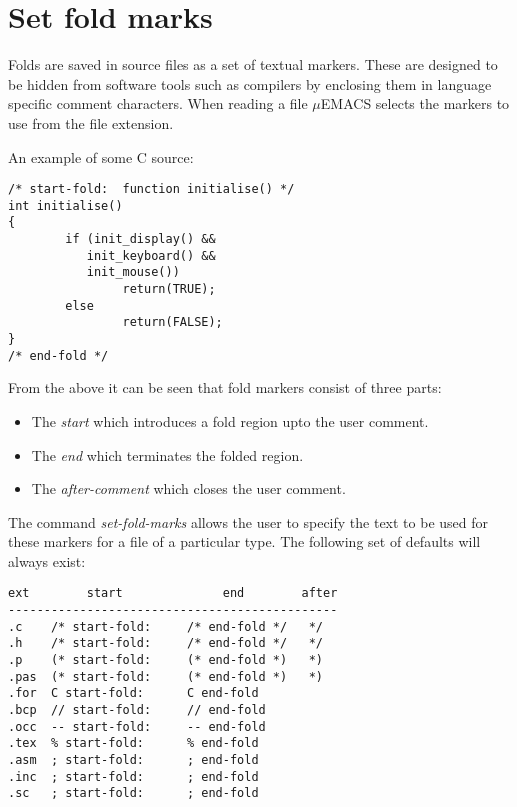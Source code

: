 \section{Set fold marks}

Folds are saved in source files as a set of textual markers. These are
designed to be hidden from software tools such as compilers by
enclosing them in language specific comment characters. When reading a
file $\mu$EMACS selects the markers to use from the file extension.

An example of some C source:

\begin{verbatim}
/* start-fold:  function initialise() */
int initialise()
{
        if (init_display() &&
           init_keyboard() &&
           init_mouse())
                return(TRUE);
        else
                return(FALSE);
}
/* end-fold */
\end{verbatim}

From the above it can be seen that fold markers consist of three
parts:

\begin{itemize}
\item The {\em start} which introduces a fold region upto the user comment.
\item The {\em end} which terminates the folded region.
\item The {\em after-comment} which closes the user comment.
\end{itemize}

The command {\it set-fold-marks} allows the user to specify the text to
be used for these markers for a file of a particular type.  The
following set of defaults will always exist:

\begin{verbatim}
ext        start              end        after
----------------------------------------------
.c    /* start-fold:     /* end-fold */   */
.h    /* start-fold:     /* end-fold */   */
.p    (* start-fold:     (* end-fold *)   *)
.pas  (* start-fold:     (* end-fold *)   *)
.for  C start-fold:      C end-fold
.bcp  // start-fold:     // end-fold
.occ  -- start-fold:     -- end-fold
.tex  % start-fold:      % end-fold
.asm  ; start-fold:      ; end-fold
.inc  ; start-fold:      ; end-fold
.sc   ; start-fold:      ; end-fold
\end{verbatim}

